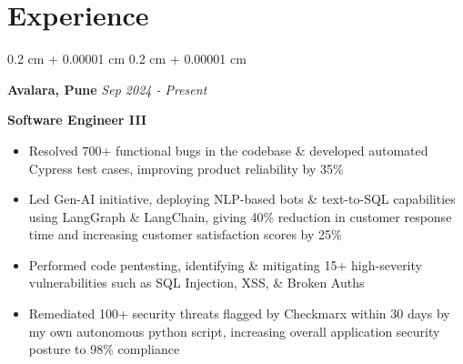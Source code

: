 \documentclass[10pt, letterpaper]{article}
\newenvironment{highlights}{
    \begin{itemize}[
        topsep=0.10 cm,
        parsep=0.10 cm,
        partopsep=0pt,
        itemsep=0pt,
        leftmargin=0.4 cm
    ]
}{
    \end{itemize}
} %
\newenvironment{onecolentry}{
    \begin{adjustwidth}{
        0.2 cm + 0.00001 cm
    }{
        0.2 cm + 0.00001 cm
    }
}{
    \end{adjustwidth}
} %
\begin{document}
    
    \section{Experience}



        
        \begin{onecolentry}
            \fontsize{11 pt}{11 pt}
            \textbf{Avalara, Pune} \hfill \textit{Sep 2024 - Present}

            \fontsize{11 pt}{11 pt}
            \textbf{Software Engineer III}
            \begin{highlights}
                \item Resolved 700+ functional bugs in the codebase \& developed automated Cypress test cases, improving product reliability by 35\%
                
                \item	Led Gen-AI initiative, deploying NLP-based bots \& text-to-SQL capabilities using LangGraph \& LangChain, giving 40\% reduction in customer response time and increasing customer satisfaction scores by 25\%

                \item	Performed code pentesting, identifying \& mitigating 15+ high-severity vulnerabilities such as SQL Injection, XSS, \& Broken Auths
                
                \item	Remediated 100+ security threats flagged by Checkmarx within 30 days by my own autonomous python script, increasing overall application security posture to 98\% compliance

            \end{highlights}
        \end{onecolentry}


        \vspace{0.2 cm}
\end{document}
